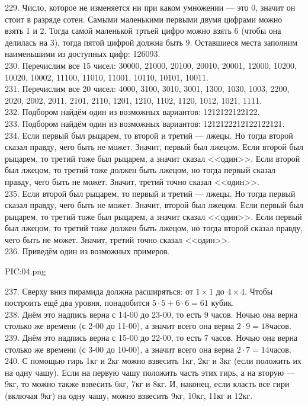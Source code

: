 229. Число, которое не изменяется ни при каком умножении --- это 0, значит он стоит в разряде сотен. Самыми маленькими первыми двумя цифрами можно взять 1 и 2. Тогда самой маленькой тртьей цифро можно взять 6 (чтобы она делилась на 3), тогда пятой цифрой должна быть 9. Оставшиеся места заполним наименьшими из доступных цифр: 126093.\\
230. Перечислим все 15 чисел: 30000, 21000, 20100, 20010, 20001, 12000, 10200, 10020, 10002, 11100, 11010, 11001, 10110, 10101, 10011.\\
231. Перечислим все 20 чисел: 4000, 3100, 3010, 3001, 1300, 1030, 1003, 2200, 2020, 2002, 2011, 2101, 2110, 1201, 1210, 1102, 1120, 1012, 1021, 1111.\\
232. Подбором найдём один из возможных вариантов: 1212122122122.\\
233. Подбором найдём один из возможных вариантов: 1212122212122122121.\\
234. Если первый был рыцарем, то второй и третий --- лжецы. Но тогда второй сказал правду, чего быть не может. Значит, первый был лжецом. Если второй был рыцарем, то третий тоже был рыцарем, а значит сказал <<один>>. Если второй был лжецом, то третий тоже должен быть лжецом, но тогда первый сказал правду, чего быть не может. Значит, третий точно сказал <<один>>.\\
235. Если второй был рыцарем, то первый и третий --- лжецы. Но тогда первый сказал правду, чего быть не может. Значит, второй был лжецом. Если первый был рыцарем, то третий тоже был рыцарем, а значит сказал <<один>>. Если первый был лжецом, то третий тоже должен быть лжецом, но тогда второй сказал правду, чего быть не может. Значит, третий точно сказал <<один>>.\\
236. Приведём один из возможных примеров.
\begin{center}
{{PIC:04.png}}
\end{center}
237. Сверху вниз пирамида должна расширяться: от $1\times1$ до $4\times4.$ Чтобы построить ещё два уровня, понадобится $5\cdot5+6\cdot6=61$ кубик.\\
238. Днём это надпись верна с 14-00 до 23-00, то есть 9 часов. Ночью она верна столько же времени (с 2-00 до 11-00), а значит всего она верна $2\cdot9=18$часов.\\
239. Днём это надпись верна с 15-00 до 22-00, то есть 7 часов. Ночью она верна столько же времени (с 3-00 до 10-00), а значит всего она верна $2\cdot7=14$часов.\\
240. С помощью гирь 1кг и 2кг можно взвесить 1кг, 2кг и 3кг (если положить их на одну чашу). Если на первую чашу положить часть этих гирь, а на вторую --- 9кг, то можно также взвесить 6кг, 7кг и 8кг. И, наконец, если класть все гири (включая 9кг) на одну чашу, можно взвесить 9кг, 10кг, 11кг и 12кг.\\
